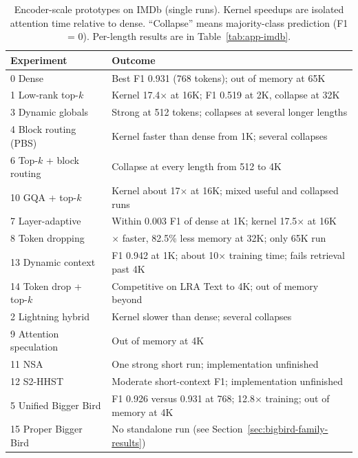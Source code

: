 \documentclass[11pt]{article}
\begin{document}
\begin{table}[ht]
  \centering
  \small
  \caption{Encoder-scale prototypes on IMDb (single runs). Kernel speedups
  are isolated attention time relative to dense. ``Collapse'' means
  majority-class prediction (F1 = 0). Per-length results are in
  Table~\ref{tab:app-imdb}.}
  \label{tab:dev-summary}
  \begin{tabularx}{\textwidth}{@{}l>{\raggedright\arraybackslash}X@{}}
    \toprule
    Experiment & Outcome \\
    \midrule
    0 Dense & Best F1 0.931 (768 tokens); out of memory at 65K \\
    \midrule
    1 Low-rank top-$k$ & Kernel 17.4$\times$ at 16K; F1 0.519 at 2K, collapse at 32K \\
    3 Dynamic globals & Strong at 512 tokens; collapses at several longer lengths \\
    4 Block routing (PBS) & Kernel faster than dense from 1K; several collapses \\
    6 Top-$k$ + block routing & Collapse at every length from 512 to 4K \\
    10 GQA + top-$k$ & Kernel about 17$\times$ at 16K; mixed useful and collapsed runs \\
    \midrule
    7 Layer-adaptive & Within 0.003 F1 of dense at 1K; kernel 17.5$\times$ at 16K \\
    8 Token dropping & 3.47$\times$ faster, 82.5\% less memory at 32K; only 65K run \\
    13 Dynamic context & F1 0.942 at 1K; about 10$\times$ training time; fails retrieval past 4K \\
    14 Token drop + top-$k$ & Competitive on LRA Text to 4K; out of memory beyond \\
    \midrule
    2 Lightning hybrid & Kernel slower than dense; several collapses \\
    9 Attention speculation & Out of memory at 4K \\
    11 NSA & One strong short run; implementation unfinished \\
    12 S2-HHST & Moderate short-context F1; implementation unfinished \\
    \midrule
    5 Unified Bigger Bird & F1 0.926 versus 0.931 at 768; 12.8$\times$ training; out of memory at 4K \\
    15 Proper Bigger Bird & No standalone run (see Section~\ref{sec:bigbird-family-results}) \\
    \bottomrule
  \end{tabularx}
\end{table}
\end{document}
